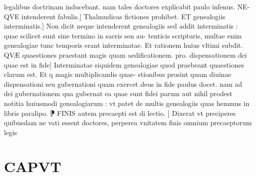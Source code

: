 \documentclass{article}
\begin{document}
\begin{pages}
legalibus doctrinam inducebant. nam tales doctores explicabit paulo infenus. NE- QVE intenderent fabulis.] Thalmudicas fictiones prohibet. ET genealogiis interminatis.] Non dicit neque  intenderent genealogiis  sed addit interminatis : quae scilicet sunt sine termino in sacris sen au- tenticis scripturis, multae enim genealogiae tunc temporis erant interminatae. Et rationem huius vltimi subdit. QVÆ quaestiones praestant magis quam aedificationem. pro. dispensationem  dei quae est in fide] Interminatae siquidem genealogiae quod praebeant quaestiones  clarum est. Et q magis multiplicandis quae- stionibus prosint quam diuinae dispensationi seu gubernationi quam exercet deus in fide  paulus docet. nam ad dei gubernationem qua gubernat ea quae sunt fidei  parum aut nihil prodest notitia huiusmodi genealogiarum : vt patet de multis genealogiis quas hemmus in libris paralipo. ⁋ FINIS autem precaepti est di lectio. ] Dixerat vt preciperes quibusdam ne vati essent doctores, perperea vnitatem finis omnium precaeptorum legis  \pend
\section*{CAPVT }

\end{pages}
\end{document}
